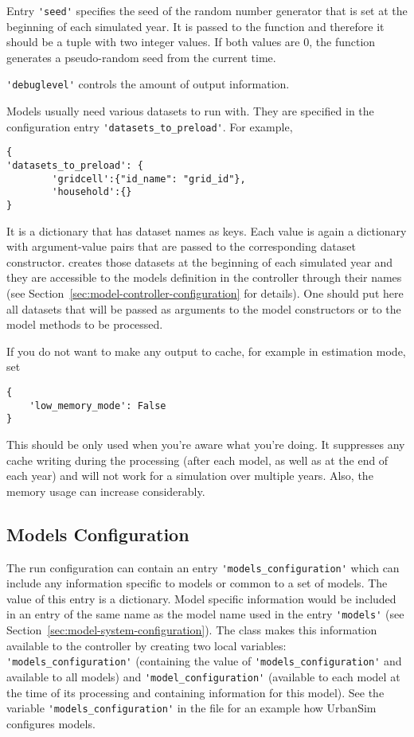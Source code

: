 Entry \verb|'seed'| specifies the seed of the random number generator that is set at
the beginning of each simulated year. It is passed to the  \numpyindex
function  and therefore it should be a tuple with two integer
values. If both values are 0, the function generates a pseudo-random seed
from the current time.

\verb|'debuglevel'| controls the amount of output information.

Models usually need various datasets to run with. They are specified in the
configuration entry \verb|'datasets_to_preload'|. For example,
\begin{verbatim}
{
'datasets_to_preload': {
        'gridcell':{"id_name": "grid_id"},
        'household':{}
}
\end{verbatim}
It is a dictionary that has dataset names as keys. Each value is again a
dictionary with argument-value pairs that are passed to the corresponding
dataset constructor.  creates those datasets at the
beginning of each simulated year and they are accessible to the models 
definition in the controller through their names (see
Section~\ref{sec:model-controller-configuration} for details). One should put
here all datasets that will be passed as arguments to the model constructors
or to the model methods to be processed.

If you do not want to make any output to cache, for example in estimation mode, set
\begin{verbatim}
{
    'low_memory_mode': False
}
\end{verbatim}
This should be only used when you're aware what you're doing.
It suppresses any cache writing during the processing (after each model, as
well as at the end of each year) and will not work for a simulation
over multiple years. Also, the memory usage can increase considerably.


\subsection{Models Configuration}
\label{sec:models-configuration}
%
The run configuration can contain an entry \verb|'models_configuration'| which can
include any information specific to models or common to a set of models. The
value of this entry is a dictionary.  Model specific information would be
included in an entry of the same name as the model name used in the entry
\verb|'models'| (see Section~\ref{sec:model-system-configuration}). The
 class makes this information available to the controller
by creating two local variables: \verb|'models_configuration'| (containing the
value of \verb|'models_configuration'| and available to all models) and
\verb|'model_configuration'| (available to each model at the time of its
processing and containing information for this model). See the variable
\verb|'models_configuration'| in the file  for an
example how UrbanSim configures models. 


